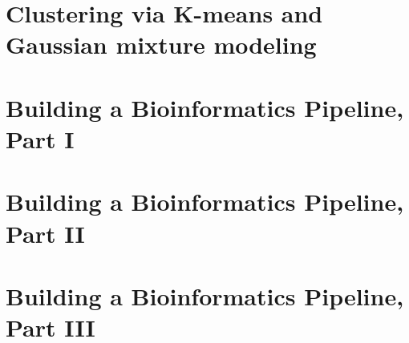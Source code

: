 \documentclass[9pt,twocolumn,oneside,bigheadings,tablecaptionabove]{scrbook}
\begin{document}
\chapter{Clustering via K-means and Gaussian mixture modeling}


\chapter{Building a Bioinformatics Pipeline, Part I}


\chapter{Building a Bioinformatics Pipeline, Part II}


\chapter{Building a Bioinformatics Pipeline, Part III}



% 
% 
% 
% 
\end{document}

